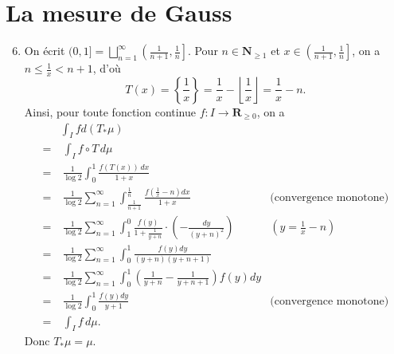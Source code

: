 \documentclass[french]{article}
\theoremstyle{definition}
\newcommand{\set}[1]{\left\{#1\right\}}
\newcommand{\tuple}[1]{\left(#1\right)}
\newcommand{\olin}[1]{\left(#1\right]}
\newcommand{\floor}[1]{\left\lfloor#1\right\rfloor}
\newcommand{\Nbb}{\mathbf{N}}
\newcommand{\Rbb}{\mathbf{R}}
\begin{document}
\section*{La mesure de Gauss}
\begin{enumerate}
    \setcounter{enumi}{5}
    \item \label{Partie6}
        On \'ecrit $(0,1] = \bigsqcup_{n = 1}^\infty \olin{\frac{1}{n+1},\frac{1}{n}}$. Pour $n \in \Nbb_{\ge 1}$ et $x \in \olin{\frac{1}{n+1},\frac{1}{n}}$, on a $n \le \frac{1}{x} < n+1$, d'o\`u 
            $$T(x) = \set{\frac{1}{x}} = \frac{1}{x} - \floor{\frac{1}{x}} = \frac{1}{x} - n.$$
        Ainsi, pour toute fonction continue $f:I \to \Rbb_{\ge 0}$, on a
            \begin{align*}
                & \int_I f d(T_\ast \mu)\\
                = & \ 
                \int_{I} f \circ T \,d\mu \\
                = & \ \frac{1}{\log 2}\int_0^1 \frac{f(T(x))\,dx}{1 + x} \\
                = & \ \frac{1}{\log 2}\sum_{n = 1}^\infty \int_{\frac{1}{n+1}}^{\frac{1}{n}} \frac{f\tuple{\frac{1}{x} - n}dx}{1 + x} & \text{(convergence monotone)}\\
                = & \ \frac{1}{\log 2}\sum_{n = 1}^\infty \int_1^0 \frac{f(y)}{1 + \frac{1}{y+n}} \cdot \tuple{-\frac{dy}{(y+n)^2}} & (y = \frac{1}{x} - n) \\
                = & \ \frac{1}{\log 2}\sum_{n = 1}^\infty \int_0^1 \frac{f(y)dy}{(y+n)(y+n+1)} \\
                = & \ \frac{1}{\log 2}\sum_{n=1}^\infty \int_0^1 \tuple{\frac{1}{y+n} - \frac{1}{y+n+1}}f(y)dy \\
                = & \ \frac{1}{\log 2}\int_0^1 \frac{f(y)dy}{y+1} & \text{(convergence monotone)}\\
                = & \ \int_I f\, d\mu.
            \end{align*}
        Donc $T_\ast \mu = \mu$.
        

\end{enumerate}
\end{document}
